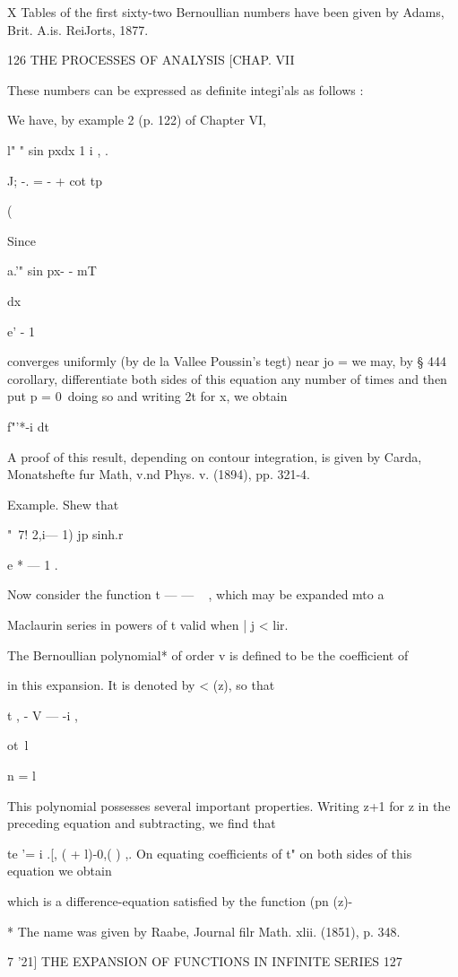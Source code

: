 X Tables of the first sixty-two Bernoullian numbers have been given by
Adams, Brit. A.is. ReiJorts, 1877.

126 THE PROCESSES OF ANALYSIS [CHAP. VII

These numbers can be expressed as definite integi'als as follows :

We have, by example 2 (p. 122) of Chapter VI,

l" " sin pxdx 1 i , .

J; -. = - + cot tp

(

Since

a.'" sin px- - mT\

dx

e' - 1

converges uniformly (by de la Vallee Poussin's tegt) near jo = we may,
by § 444 corollary, differentiate both sides of this equation any
number of times and then put p = 0\ doing so and writing 2t for x, we
obtain

f"'*-i dt

A proof of this result, depending on contour integration, is given by
Carda, Monatshefte fur Math, v.nd Phys. v. (1894), pp. 321-4.

Example. Shew that

"~7! 2,i— 1) jp sinh.r

e * — 1 .

Now consider the function t — — ~ , which may be expanded mto a

Maclaurin series in powers of t valid when | j < lir.

The Bernoullian polynomial* of order v is defined to be the
coefficient of

in this expansion. It is denoted by < (z), so that

t , - V — -i ,

ot\ l

n = l

This polynomial possesses several important properties. Writing z+1
for z in the preceding equation and subtracting, we find that

te '= i .[, ( + l)-0,( ) ,. On equating coefficients of t" on both
sides of this equation we obtain

which is a difference-equation satisfied by the function (pn (z)-

* The name was given by Raabe, Journal filr Math. xlii. (1851), p.
348.

7 '21] THE EXPANSION OF FUNCTIONS IN INFINITE SERIES 127

